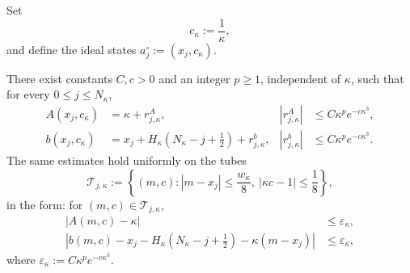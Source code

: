 Set
\begin{equation}\label{eq:matched-covariance}
    c_\kappa:=\frac1\kappa,
\end{equation}
and define the ideal states $a_j^\circ:=(x_j,c_\kappa)$.

\begin{lemma}\label{lem:bump-averages}
    There exist constants $C,c>0$ and an integer $p\geq1$, independent of $\kappa$, such that
    for every $0\leq j\leq N_\kappa$,
    \begin{align}
    \label{eq:center-A-estimate}
        A(x_j,c_\kappa)&=\kappa+r^A_{j,\kappa},
        &|r^A_{j,\kappa}|&\leq C\kappa^pe^{-c\kappa^3},\\
    \label{eq:center-b-estimate}
        b(x_j,c_\kappa)&=x_j+H_\kappa\left(N_\kappa-j+\frac12\right)+r^b_{j,\kappa},
        &|r^b_{j,\kappa}|&\leq C\kappa^pe^{-c\kappa^3}.
    \end{align}
    The same estimates hold uniformly on the tubes
    \begin{equation}\label{eq:bump-tube}
        \mathcal T_{j,\kappa}
        :=\left\{(m,c):|m-x_j|\leq\frac{w_\kappa}8,\ |\kappa c-1|\leq\frac18\right\},
    \end{equation}
    in the form: for $(m,c)\in\mathcal T_{j,\kappa}$,
    \begin{align}
    \label{eq:tube-A}
        |A(m,c)-\kappa|&\leq\varepsilon_\kappa,\\
    \label{eq:tube-b}
        \left|b(m,c)-x_j-H_\kappa\left(N_\kappa-j+\frac12\right)-\kappa(m-x_j)\right|
        &\leq\varepsilon_\kappa,
    \end{align}
    where $\varepsilon_\kappa:=C\kappa^pe^{-c\kappa^3}$.
\end{lemma}

